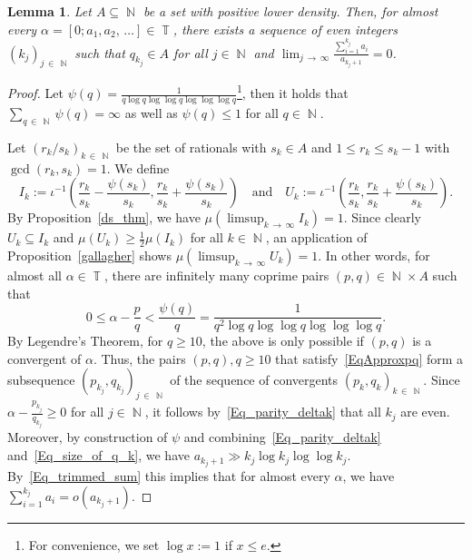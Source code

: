 \documentclass[10pt,a4paper]{amsart}
\numberwithin{equation}{section}
\DeclareMathOperator{\N}{\mathbb{N}}
\DeclareMathOperator{\T}{\mathbb{T}}
\newtheorem{lemm}[theo]{Lemma}
\theoremstyle{definition}
\begin{document}
\begin{lemm}\label{Lem_seq_kj}
Let $A \subseteq \N$ be a set with positive lower density. Then, for almost every $\alpha = [0;a_1, a_2,\,\ldots] \in \T$, there exists a sequence of even integers $(k_j)_{j\,\in\,\N}$ such that $q_{k_j} \in A$ for all $j \in \N$ and $ \lim_{j\,\to\,\infty} \frac{\sum_{i=1}^{k_j} a_i }{a_{k_j +1}} = 0$.
\end{lemm}


\begin{proof}
Let $ \psi(q) = \frac{1}{q \log q \log \log q \log \log \log q }$\footnote{For convenience, we set $ \log x := 1$ if $x \leq e$.}, then it holds that $ \sum_{q\,\in\,\N} \psi(q)= \infty$ as well as $\psi(q) \leq 1$ for all $q \in \N$.


Let $(r_k/s_k)_{k\,\in\,\N}$ be the set of rationals with $s_k \in A$ and $1 \leq r_k \leq s_{k}-1$ with $\gcd(r_k,s_k) =1$. We define
\begin{equation*}
I_k:= \iota^{-1}\left(\frac{r_k}{s_k} - \frac{\psi(s_k)}{s_k}, \frac{r_k}{s_k} + \frac{\psi(s_k)}{s_k} \right) \quad \text{and} \quad U_k := \iota^{-1}\left(\frac{r_k}{s_k}, \frac{r_k}{s_k} + \frac{\psi(s_k)}{s_k} \right).
\end{equation*}
By Proposition~\ref{ds_thm}, we have $\mu(\limsup_{k\,\to\,\infty} I_k) = 1$. Since clearly $U_k \subseteq I_k$ and $ \mu(U_k) \geq \frac{1}{2}\mu(I_k)$ for all $k \in \N$, an application of Proposition~\ref{gallagher} shows \newline$ \mu(\limsup_{k\,\rightarrow\,\infty} U_k)  = 1$. In other words, for almost all $\alpha \in \T$, there are infinitely many coprime pairs $(p,q) \in \N \times A$ such that
\begin{equation}\label{EqApproxpq}
0 \leq \alpha - \frac{p}{q} < \frac{\psi(q)}{q} = \frac{1}{q^2 \log q \log \log q \log \log \log q}.
\end{equation}
By Legendre's Theorem, for $q \geq 10$, the above is only possible if $ (p,q)$ is a convergent of $\alpha $. Thus, the pairs $(p,q), q \geq 10$ that satisfy~\eqref{EqApproxpq} form a subsequence $ (p_{k_j}, q_{k_j})_{j\,\in\,\N}$ of the sequence of convergents $ (p_k, q_k)_{k\,\in\,\N}$. Since $\alpha - \frac{p_{k_j}}{q_{k_j}} \geq 0 $ for all $j \in \N$, it follows by~\eqref{Eq_parity_deltak} that all $k_j$ are even. Moreover, by construction of $\psi$ and combining~\eqref{Eq_parity_deltak} and~\eqref{Eq_size_of_q_k}, we have $ a_{k_j+1} \gg k_j \log k_j \log \log k_j$. By~\eqref{Eq_trimmed_sum} this implies that for almost every $\alpha$, we have $\sum_{i=1}^{k_j} a_i = o (a_{k_j +1}) $.
\end{proof}
\end{document}
